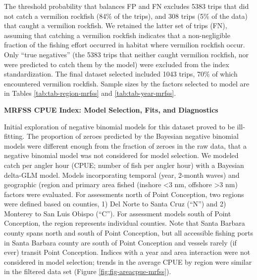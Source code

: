 \documentclass[
]{article}
\begin{document}
The threshold probability that balances FP and FN excludes
5383
trips that did not catch a vermilion rockfish (84\%
of the trips), and 308
trips (5\% of the data) that
caught a vermilion rockfish. We retained the latter set of trips (FN), assuming that
catching a vermilion rockfish indicates that a non-negligible fraction of the fishing
effort occurred in habitat where vermilion rockfish occur. Only ``true negatives''
(the 5383
trips that neither caught vermilion rockfish, nor were predicted to catch them by the model)
were excluded from the index standardization. The final dataset selected included
1043 trips, 70\%
of which encountered vermilion rockfish. Sample sizes by the factors selected to model are in Tables
\ref{tab:tab-region-mrfss} and \ref{tab:tab-year-mrfss}.

\textbf{MRFSS CPUE Index: Model Selection, Fits, and Diagnostics}

Initial exploration of negative binomial models for this dataset proved to be
ill-fitting. The proportion of zeroes predicted by the Bayesian negative binomial
models were different enough from the fraction of zeroes in the raw data, that
a negative binomial model was not considered for model selection. We modeled catch
per angler hour (CPUE; number of fish per angler hour) with a Bayesian delta-GLM model.
Models incorporating temporal (year, 2-month waves)
and geographic (region and primary area fished (inshore \textless3 nm, offshore \textgreater3 nm)
factors were evaluated. For assessments north of Point Conception, two regions were defined based on counties, 1) Del Norte
to Santa Cruz (``N'') and 2) Monterey to San Luis Obispo (``C''). For assessment models south
of Point Conception, the region represents individual counties. Note that Santa Barbara
county spans north and south of Point Conception, but all accessible fishing ports in Santa Barbara county are south of Point Conception and vessels rarely (if ever) transit Point Conception. Indices with a year and area interaction were not considered in model selection; trends in the average CPUE by region were similar in the filtered data set (Figure \ref{fig:fig-areacpue-mrfss}).
\end{document}

